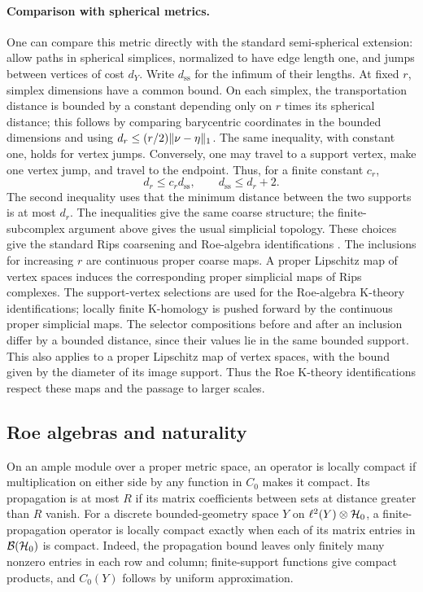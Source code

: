 \paragraph{Comparison with spherical metrics.}
One can compare this metric directly with the standard semi-spherical extension:
allow paths in spherical simplices, normalized to have edge length one,
and jumps between vertices of cost $d_Y$. Write $d_{\mathrm{ss}}$ for the
infimum of their lengths. At fixed $r$, simplex dimensions have a common
bound. On each simplex, the transportation distance is bounded by a
constant depending only on $r$ times its spherical distance; this follows
by comparing barycentric coordinates in the bounded dimensions and using
$d_r\le (r/2)\lVert \nu-\eta\rVert_1$. The same inequality, with constant one,
holds for vertex jumps. Conversely, one may travel to a support vertex,
make one vertex jump, and travel to the endpoint. Thus, for a finite
constant $c_r$,
\[
 d_r\le c_r d_{\mathrm{ss}},\qquad d_{\mathrm{ss}}\le d_r+2.
\]
The second inequality uses that the minimum distance between the two
supports is at most $d_r$. The inequalities give the same coarse structure;
the finite-subcomplex argument above gives the usual simplicial topology.
These choices give the standard Rips coarsening and Roe-algebra
identifications \cite[Definition~7.2.8, Proposition~7.2.11 and Theorem~7.2.16]{WY}.
The inclusions for increasing
$r$ are continuous proper coarse maps. A proper Lipschitz map of vertex
spaces induces the corresponding proper simplicial maps of Rips complexes.
The support-vertex selections are used for the Roe-algebra K-theory
identifications; locally finite K-homology is pushed forward by the
continuous proper simplicial maps. The selector compositions before and
after an inclusion differ by a bounded distance, since their values lie
in the same bounded support. This also applies to a proper Lipschitz map
of vertex spaces, with the bound given by the diameter of its image support.
Thus the Roe K-theory identifications respect
these maps and the passage to larger scales.

\subsection{Roe algebras and naturality}
On an ample module over a proper metric space, an operator is locally compact
if multiplication on either side by any function in $C_0$ makes it compact.
Its propagation is at most $R$ if its matrix coefficients between sets at
distance greater than $R$ vanish. For a discrete bounded-geometry space $Y$
on $\ell^2(Y)\otimes\mathcal H_0$, a finite-propagation operator is locally compact
exactly when each of its matrix entries in $\mathcal B(\mathcal H_0)$ is compact.
Indeed, the propagation bound leaves only finitely many nonzero entries in
each row and column; finite-support functions give compact products, and
$C_0(Y)$ follows by uniform approximation.

